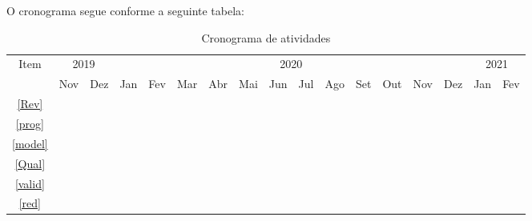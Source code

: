 \documentclass[_ArquivoPrincipal.tex]{subfiles}
\begin{document}
O cronograma segue conforme a seguinte tabela:
\begin{table}[H]
	\fontsize{10}{14}\selectfont
	\centering	
	
	\begin{tabular}{c|cc|cccccccccccc|cc}
		\hline
		   \multirow{2}{*}{Item} & \multicolumn{2}{c|}{2019} & \multicolumn{12}{c|}{2020} & \multicolumn{2}{c}{2021} \\ \cline{2-17}
		    & Nov & Dez & Jan & Fev & Mar & Abr & Mai & Jun & Jul & Ago & Set & Out & Nov & Dez & Jan & Fev \\ \hline
		 \ref{Rev} & \cellcolor{ativ} & \cellcolor{ativ} & \cellcolor{ativ} & \cellcolor{ativ}& \cellcolor{ativ} & \cellcolor{ativ} & \cellcolor{ativ} & \cellcolor{ativ} & \cellcolor{ativ} & \cellcolor{ativ} & \cellcolor{ativ} & \cellcolor{ativ} & & & & \\ \hline
		 \ref{prog} & \cellcolor{ativ} & \cellcolor{ativ} & \cellcolor{ativ} & \cellcolor{ativ} & & & & & & & & & & & & \\ \hline
		 \ref{model} & & & & & \cellcolor{ativ} & \cellcolor{ativ} & \cellcolor{ativ} & \cellcolor{ativ} & \cellcolor{ativ} & & & & & \\ \hline
		 \ref{Qual} & & & & & & & & & & \cellcolor{ativ} & & & & & & \\ \hline
		 \ref{valid} & & & & & & & & & & & \cellcolor{ativ} & \cellcolor{ativ} & \cellcolor{ativ} & \cellcolor{ativ} & \cellcolor{ativ} & \cellcolor{ativ} \\ \hline
		 \ref{red} & \cellcolor{ativ} & \cellcolor{ativ} & \cellcolor{ativ} & \cellcolor{ativ} & \cellcolor{ativ} & \cellcolor{ativ} & \cellcolor{ativ} & \cellcolor{ativ} & \cellcolor{ativ} & \cellcolor{ativ} & \cellcolor{ativ} & \cellcolor{ativ} & \cellcolor{ativ} & \cellcolor{ativ} & \cellcolor{ativ} & \cellcolor{ativ} \\ \hline
	\end{tabular}
	\caption{Cronograma de atividades}
\end{table}


	
\end{document}
